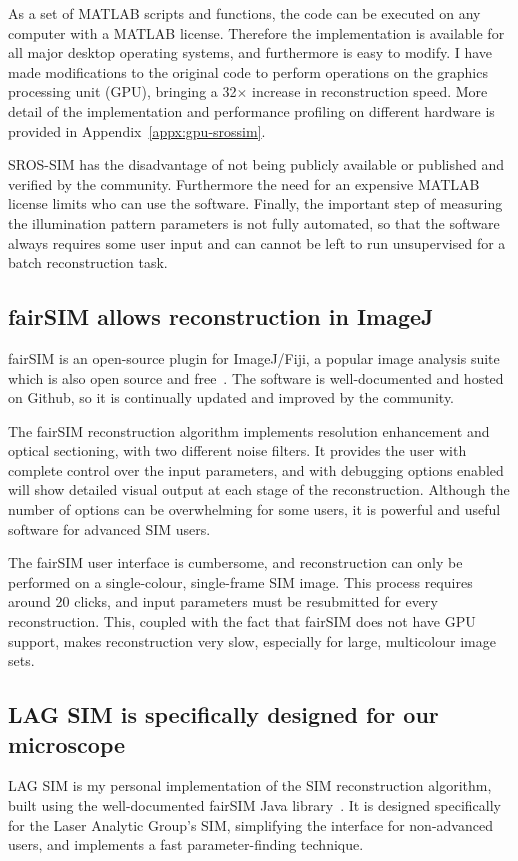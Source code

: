 As a set of MATLAB scripts and functions, the code can be executed on any computer with a MATLAB license.
Therefore the implementation is available for all major desktop operating systems, and furthermore is easy to modify.
I have made modifications to the original code to perform operations on the graphics processing unit (GPU), bringing a 32$\times$ increase in reconstruction speed.
More detail of the implementation and performance profiling on different hardware is provided in Appendix~\ref{appx:gpu-srossim}. 

SROS-SIM has the disadvantage of not being publicly available or published and verified by the community.
Furthermore the need for an expensive MATLAB license limits who can use the software.
Finally, the important step of measuring the illumination pattern parameters is not fully automated, so that the software always requires some user input and can cannot be left to run unsupervised for a batch reconstruction task.

\subsection{fairSIM allows reconstruction in ImageJ}
fairSIM is an open-source plugin for ImageJ/Fiji, a popular image analysis suite which is also open source and free~\cite{muller2016open, schindelin2012fiji}.
The software is well-documented and hosted on Github, so it is continually updated and improved by the community.

The fairSIM reconstruction algorithm implements resolution enhancement and optical sectioning, with two different noise filters.
It provides the user with complete control over the input parameters, and with debugging options enabled will show detailed visual output at each stage of the reconstruction.
Although the number of options can be overwhelming for some users, it is powerful and useful software for advanced SIM users.

The fairSIM user interface is cumbersome, and reconstruction can only be performed on a single-colour, single-frame SIM image.
This process requires around 20 clicks, and input parameters must be resubmitted for every reconstruction.
This, coupled with the fact that fairSIM does not have GPU support, makes reconstruction very slow, especially for large, multicolour image sets.

\subsection{LAG SIM is specifically designed for our microscope}
LAG SIM is my personal implementation of the SIM reconstruction algorithm, built using the well-documented fairSIM Java library~\cite{fairsimGithub}.
It is designed specifically for the Laser Analytic Group's SIM, simplifying the interface for non-advanced users, and implements a fast parameter-finding technique.

